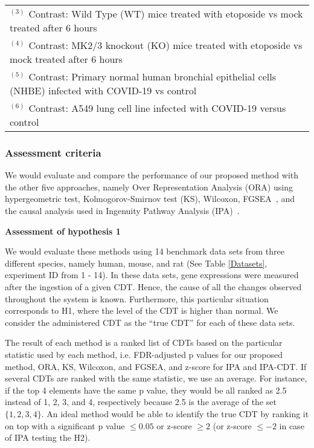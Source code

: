 \begin{table}
\begin{center}
\begin{tabular}{ c|cccc }
 \multicolumn{5}{l}{\tiny $^{(3)}$ Contrast: Wild Type (WT) mice treated with etoposide vs mock treated after 6 hours}\\
 \multicolumn{5}{l}{\tiny $^{(4)}$ Contrast: MK2/3 knockout (KO) mice treated with etoposide vs mock treated after 6 hours}\\
 \multicolumn{5}{l}{\tiny $^{(5)}$ Contrast: Primary normal human bronchial epithelial cells (NHBE) infected with COVID-19 vs control}\\
 \multicolumn{5}{l}{\tiny $^{(6)}$ Contrast: A549 lung cell line infected with COVID-19 versus control}\\
\end{tabular}
\end{center}
\end{table}


\subsubsection{Assessment criteria}


We would evaluate and compare the performance of our proposed method with the other five approaches, namely Over Representation Analysis (ORA) using hypergeometric test, Kolmogorov-Smirnov test (KS)\cite{massey1951kolmogorov}, Wilcoxon\cite{wilcoxon1945individual}, FGSEA~\cite{korotkevich2021fast}, and the causal analysis used in Ingenuity Pathway Analysis (IPA)~\cite{kramer2013causal}.



\textbf{Assessment of hypothesis 1}

We would evaluate these methods using 14 benchmark data sets from three different species, namely human, mouse, and rat (See Table \ref{Datasets}, experiment ID from 1 - 14). 
In these data sets, gene expressions were measured after the ingestion of a given CDT.
Hence, the cause of all the changes observed  throughout the system is known. Furthermore, this particular situation corresponds to  H1, where the level of the CDT is higher than normal.
We consider the administered CDT as the ``true CDT'' for each of these data sets.

The result of each method is a ranked list of CDTs based on the particular statistic used by each method, i.e. FDR-adjusted p values for our proposed method, ORA, KS, Wilcoxon, and FGSEA, and  z-score  for IPA and IPA-CDT. 
If several CDTs are ranked with the same statistic, we use an average. For instance, if  the top 4 elements have the same p value, they would be all ranked as 2.5 instead of 1, 2, 3, and 4, respectively because 2.5 is the average of the set $\{1, 2, 3, 4\}$.
An ideal method would be able to identify the true CDT by ranking it on top with a significant p value $\leq 0.05$ or  z-score $\geq 2$ (or z-score $\leq -2$ in case of IPA testing the H2).

